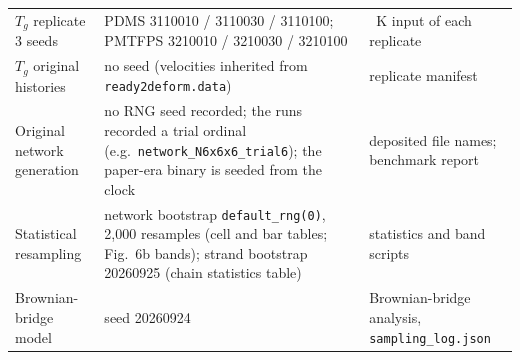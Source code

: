 \begin{tabular}{>{\raggedright\arraybackslash}p{3.9cm}>{\raggedright\arraybackslash}p{6.7cm}>{\raggedright\arraybackslash}p{4.5cm}}
$T_g$ replicate 3 seeds & PDMS 3110010 / 3110030 / 3110100; PMTFPS 3210010 / 3210030 / 3210100 & 305~K input of each replicate \\
$T_g$ original histories & no seed (velocities inherited from \texttt{ready2deform.data}) & replicate manifest \\
Original network generation & no RNG seed recorded; the runs recorded a trial ordinal (e.g.\ \texttt{network\_N6x6x6\_trial6}); the paper-era binary is seeded from the clock & deposited file names; benchmark report \\
Statistical resampling & network bootstrap \texttt{default\_rng(0)}, 2,000 resamples (cell and bar tables; Fig.~6b bands); strand bootstrap 20260925 (chain statistics table) & statistics and band scripts \\
Brownian-bridge model & seed 20260924 & Brownian-bridge analysis, \texttt{sampling\_log.json} \\
\bottomrule
\end{tabular}
